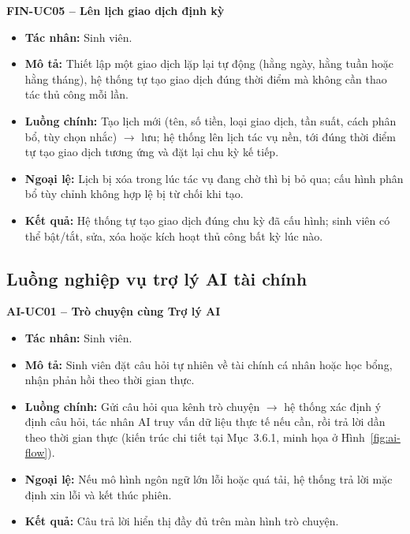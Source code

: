 \noindent\textbf{FIN-UC05 -- Lên lịch giao dịch định kỳ}
\begin{itemize}
    \item \textbf{Tác nhân:} Sinh viên.
    \item \textbf{Mô tả:} Thiết lập một giao dịch lặp lại tự động (hằng ngày, hằng tuần hoặc hằng tháng), hệ thống tự tạo giao dịch đúng thời điểm mà không cần thao tác thủ công mỗi lần.
    \item \textbf{Luồng chính:} Tạo lịch mới (tên, số tiền, loại giao dịch, tần suất, cách phân bổ, tùy chọn nhắc) $\rightarrow$ lưu; hệ thống lên lịch tác vụ nền, tới đúng thời điểm tự tạo giao dịch tương ứng và đặt lại chu kỳ kế tiếp.
    \item \textbf{Ngoại lệ:} Lịch bị xóa trong lúc tác vụ đang chờ thì bị bỏ qua; cấu hình phân bổ tùy chỉnh không hợp lệ bị từ chối khi tạo.
    \item \textbf{Kết quả:} Hệ thống tự tạo giao dịch đúng chu kỳ đã cấu hình; sinh viên có thể bật/tắt, sửa, xóa hoặc kích hoạt thủ công bất kỳ lúc nào.
\end{itemize}

\subsection{Luồng nghiệp vụ trợ lý AI tài chính}

\noindent\textbf{AI-UC01 -- Trò chuyện cùng Trợ lý AI}
\begin{itemize}
    \item \textbf{Tác nhân:} Sinh viên.
    \item \textbf{Mô tả:} Sinh viên đặt câu hỏi tự nhiên về tài chính cá nhân hoặc học bổng, nhận phản hồi theo thời gian thực.
    \item \textbf{Luồng chính:} Gửi câu hỏi qua kênh trò chuyện $\rightarrow$ hệ thống xác định ý định câu hỏi, tác nhân AI truy vấn dữ liệu thực tế nếu cần, rồi trả lời dần theo thời gian thực (kiến trúc chi tiết tại Mục~3.6.1, minh họa ở Hình~\ref{fig:ai-flow}).
    \item \textbf{Ngoại lệ:} Nếu mô hình ngôn ngữ lớn lỗi hoặc quá tải, hệ thống trả lời mặc định xin lỗi và kết thúc phiên.
    \item \textbf{Kết quả:} Câu trả lời hiển thị đầy đủ trên màn hình trò chuyện.
\end{itemize}

